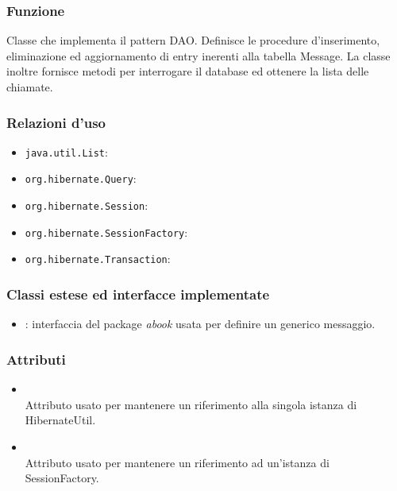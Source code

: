 
\subsubsection*{Funzione}
Classe che implementa il pattern DAO. Definisce le procedure d’inserimento, eliminazione ed aggiornamento di entry inerenti alla tabella Message. La classe inoltre fornisce metodi per interrogare il database ed ottenere la lista delle chiamate.

\subsubsection*{Relazioni d'uso}

\begin{itemize}
	\item \texttt{java.util.List}:
	\item \texttt{org.hibernate.Query}:
	\item \texttt{org.hibernate.Session}:
	\item \texttt{org.hibernate.SessionFactory}:
	\item \texttt{org.hibernate.Transaction}:
\end{itemize}

\subsubsection*{Classi estese ed interfacce implementate}
\begin{itemize}
	\item {}: interfaccia del package \textit{abook} usata per definire un generico messaggio.
\end{itemize}

\subsubsection*{Attributi}

\begin{itemize}
	\item{}\\
	Attributo usato per mantenere un riferimento alla singola istanza di HibernateUtil.
	\item{}\\
	Attributo usato per mantenere un riferimento ad un'istanza di SessionFactory.
\end{itemize}

